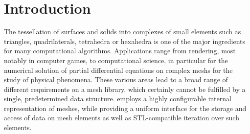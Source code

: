 
\chapter*{Introduction}    \label{intro}

The tessellation of surfaces and solids into complexes of small elements such as triangles, quadrilaterals, tetrahedra or hexahedra is one of the major ingredients for many computational algorithms.
Applications range from rendering, most notably in computer games, to computational science, in particular for the numerical solution of partial differential equations on complex meshs for the study of physical phenomena.
These various areas lead to a broad range of different requirements on a mesh library, which certainly cannot be fulfilled by a single, predetermined data structure.
{\ViennaGrid} employs a highly configurable internal representation of meshes, while providing a uniform interface for the storage and access of data on mesh elements as well as STL-compatible iteration over such elements.

